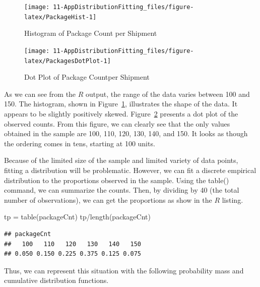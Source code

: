 \documentclass[
]{book}
\newenvironment{Shaded}{\begin{snugshade}}{\end{snugshade}}
\newcommand{\FunctionTok}[1]{\textcolor[rgb]{0.00,0.00,0.00}{#1}}
\newcommand{\NormalTok}[1]{#1}
\newcommand{\OtherTok}[1]{\textcolor[rgb]{0.56,0.35,0.01}{#1}}
\newcommand{\SpecialCharTok}[1]{\textcolor[rgb]{0.00,0.00,0.00}{#1}}
\theoremstyle{definition}
\theoremstyle{definition}
\theoremstyle{definition}
\theoremstyle{definition}
\theoremstyle{remark}
\begin{document}
\begin{figure}

{\centering \texttt{[image: 11-AppDistributionFitting\_files/figure-latex/PackageHist-1]} 

}

\caption{Histogram of Package Count per Shipment}\label{fig:PackageHist}
\end{figure}

\begin{figure}

{\centering \texttt{[image: 11-AppDistributionFitting\_files/figure-latex/PackagesDotPlot-1]} 

}

\caption{Dot Plot of Package Countper Shipment}\label{fig:PackagesDotPlot}
\end{figure}

As we can see from the \(R\) output, the range of the data varies between
100 and 150. The histogram, shown in
Figure~\ref{fig:PackageHist}, illustrates the shape of the data. It
appears to be slightly positively skewed.
Figure~\ref{fig:PackagesDotPlot} presents a dot plot of the observed
counts. From this figure, we can clearly see that the only values
obtained in the sample are 100, 110, 120, 130, 140, and 150. It looks as
though the ordering comes in tens, starting at 100 units.

Because of the limited size of the sample and limited variety of data
points, fitting a distribution will be problematic. However, we can fit
a discrete empirical distribution to the proportions observed in the
sample. Using the table() command, we can summarize the counts. Then, by
dividing by 40 (the total number of observations), we can get the
proportions as show in the \(R\) listing.

\begin{Shaded}
\begin{Highlighting}[]
\NormalTok{tp }\OtherTok{=} \FunctionTok{table}\NormalTok{(packageCnt)}
\NormalTok{tp}\SpecialCharTok{/}\FunctionTok{length}\NormalTok{(packageCnt)}
\end{Highlighting}
\end{Shaded}

\begin{verbatim}
## packageCnt
##   100   110   120   130   140   150 
## 0.050 0.150 0.225 0.375 0.125 0.075
\end{verbatim}

Thus, we can represent this situation with the following probability mass and cumulative
distribution functions.
\end{document}
